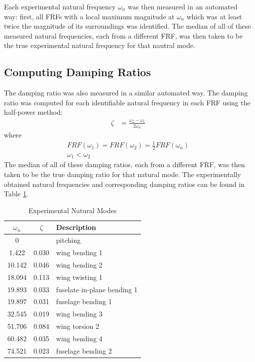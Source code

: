 Each experimental natural frequency $\omega_n$ was then measured in an automated way: first, all FRFs with a local maximum magnitude at $\omega_n$ which was at least twice the magnitude of its surroundings was identified. The median of all of these measured natural frequencies, each from a different FRF, was then taken to be the true experimental natural frequency for that nautral mode.

\subsection{Computing Damping Ratios}

The damping ratio was also measured in a similar automated way. The damping ratio was computed for each identifiable natural frequency in each FRF using the half-power method:
\begin{align}
	\zeta &= \frac{\omega_2 - \omega_1}{2\omega_n}
\end{align}
where
\begin{equation}
\begin{gathered}
	FRF(\omega_1) = FRF(\omega_2) = \frac{1}{2} FRF(\omega_n) \\
	\omega_1 < \omega_2
\end{gathered}
\end{equation}
The median of all of these damping ratios, each from a different FRF, was then taken to be the true damping ratio for that natural mode. The experimentally obtained natural frequencies and corresponding damping ratios can be found in Table \ref{tab:expModalData}.

\begin{table}[H]
    \centering
    \label{tab:expModalData}
    \caption{Experimental Natural Modes}
    \begin{tabular}{ccl}
        \hline\hline
        $\omega_n$ & $\zeta$ & Description \\
        \hline
        0      &       & pitching \\
        1.422  & 0.030 & wing bending 1 \\
        10.142 & 0.046 & wing bending 2 \\
        18.094 & 0.113 & wing twisting 1 \\
        19.893 & 0.033 & fuselate in-plane bending 1 \\
        19.897 & 0.031 & fuselage bending 1 \\
        32.545 & 0.019 & wing bending 3 \\
        51.706 & 0.084 & wing torsion 2 \\
        60.482 & 0.035 & wing bending 4 \\
        74.521 & 0.023 & fuselage bending 2 \\
        \hline\hline
    \end{tabular}
\end{table}

